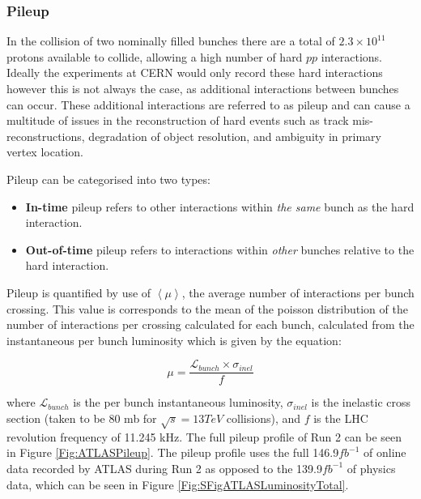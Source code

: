 \documentclass[12pt,a4paper,epsf,portrait,times,epsfig]{article}
\begin{document}

		\subsubsection{Pileup}

		In the collision of two nominally filled bunches there are a total of $2.3 \times 10^{11}$ protons available to collide, allowing a high number of hard $pp$ interactions. Ideally the experiments at CERN would only record these hard interactions however this is not always the case, as additional interactions between bunches can occur. These additional interactions are referred to as pileup and can cause a multitude of issues in the reconstruction of hard events such as track mis-reconstructions, degradation of object resolution, and ambiguity in primary vertex location. \par
		
		Pileup can be categorised into two types:

		\begin{itemize}
			\item \textbf{In-time} pileup refers to other interactions within \textit{the same} bunch as the hard interaction.
			\item \textbf{Out-of-time} pileup refers to interactions within \textit{other} bunches relative to the hard interaction.   
		\end{itemize}

		Pileup is quantified by use of $\left\langle \mu \right\rangle$, the average number of interactions per bunch crossing. This value is corresponds to the mean of the poisson distribution of the number of interactions per crossing calculated for each bunch, calculated from the instantaneous per bunch luminosity which is given by the equation:

		\begin{equation}
			\mu = \frac{\mathcal{L}_{bunch}\times\sigma_{inel}}{f}
		\end{equation}

		where $\mathcal{L}_{bunch}$ is the per bunch instantaneous luminosity, $\sigma_{inel}$ is the inelastic cross section (taken to be 80 mb for $\sqrt{s}=13 TeV$ collisions), and $f$ is the LHC revolution frequency of 11.245 kHz. The full pileup profile of Run 2
		can be seen in Figure \ref{Fig:ATLASPileup}. The pileup profile uses the full 146.9$fb^{-1}$ of online data recorded by ATLAS during Run 2 as opposed to the 139.9$fb^{-1}$ of physics data, which can be seen in Figure \ref{Fig:SFigATLASLuminosityTotal}. 
\end{document}
